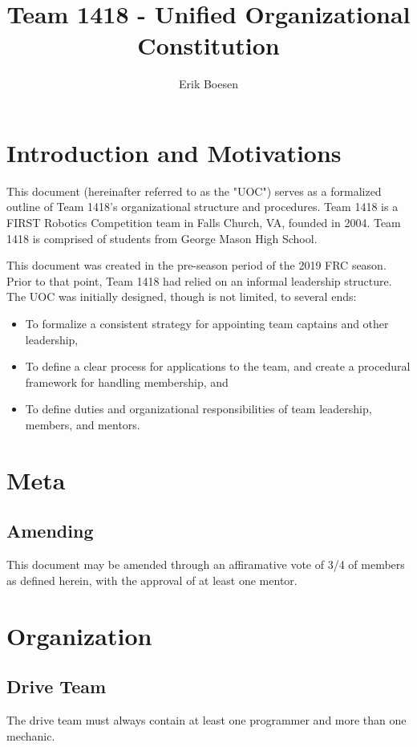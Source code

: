\documentclass{proc}
\begin{document}
\title{Team 1418 - Unified Organizational Constitution}
\author{Erik Boesen}

\maketitle

\section{Introduction and Motivations}
This document (hereinafter referred to as the "UOC") serves as a formalized outline of Team 1418's organizational structure and procedures. Team 1418 is a FIRST Robotics Competition team in Falls Church, VA, founded in 2004. Team 1418 is comprised of students from George Mason High School.

This document was created in the pre-season period of the 2019 FRC season. Prior to that point, Team 1418 had relied on an informal leadership structure. The UOC was initially designed, though is not limited, to several ends:
\begin{itemize}
  \item{To formalize a consistent strategy for appointing team captains and other leadership,}
  \item{To define a clear process for applications to the team, and create a procedural framework for handling membership, and}
  \item{To define duties and organizational responsibilities of team leadership, members, and mentors.}
\end{itemize}

\section{Meta}
\subsection{Amending}
This document may be amended through an affiramative vote of 3/4 of members as defined herein, with the approval of at least one mentor.

\section{Organization}
\subsection{Drive Team}
The drive team must always contain at least one programmer and more than one mechanic.
\end{document}
